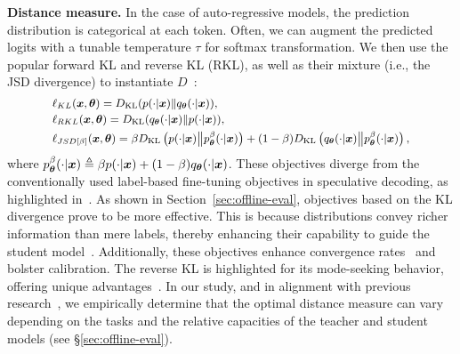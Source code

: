 \textbf{Distance measure.} 
In the case of auto-regressive models, the prediction distribution is categorical at each token. 
Often, we can augment the predicted logits with a tunable temperature $\tau$ for softmax transformation. 
We then use the popular forward KL and reverse KL (RKL), as well as their mixture (i.e., the JSD divergence) 
to instantiate $D$~\citep{agarwal2023gkd,gu2023knowledge}:
\begin{equation}
    \small
    \begin{aligned}
        &\ell_{KL}(\vx, \vtheta) = \KL( {p(\cdot|\vx)}\Vert {q_\vtheta(\cdot|\vx)}), \\
        &\ell_{RKL}(\vx, \vtheta) = \KL({q_\vtheta(\cdot|\vx)} \Vert {p(\cdot|\vx)}), \\
        &\ell_{{JSD}[\beta]} (\vx, \vtheta) = \beta \KL \left({p(\cdot|\vx)} \big\Vert {p}^\beta_\vtheta(\cdot|\vx)\right)+ (1-\beta) \KL \left({q_\vtheta(\cdot|\vx)} \big\Vert {p}^\beta_\vtheta(\cdot|\vx)\right),
    \end{aligned}
\end{equation}
where ${p}^\beta_{\bm{\theta}}(\cdot|{\bm{x}}) \triangleq \beta{p(\cdot|{\bm{x}})} + (1-\beta){q_{\bm{\theta}}(\cdot|{\bm{x}})}$. 
These objectives diverge from the conventionally used label-based fine-tuning objectives in speculative decoding, 
as highlighted in~\citep{miao2023specinfer, leviathan2023fast}. As shown in Section~\ref{sec:offline-eval},
objectives based on the KL divergence prove to be more effective. This is because distributions 
convey richer information than mere labels, thereby enhancing their capability to guide the student model~\citep{hinton2015distilling}. 
Additionally, these objectives enhance convergence rates~\citep{he2022knowledge} and bolster calibration. 
The reverse KL is highlighted for its mode-seeking behavior, offering unique advantages~\citep{gu2023knowledge}. 
In our study, and in alignment with previous research~\citep{agarwal2023gkd}, we empirically determine that the optimal 
distance measure can vary depending on the tasks and the relative capacities of the teacher and student models (see \S\ref{sec:offline-eval}).


